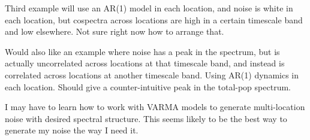 \documentclass[letterpaper,11pt]{article}
\begin{document}
Third example will use an AR(1) model in each location, and noise is white in each location, but cospectra across locations are high in a certain timescale band and low elsewhere. Not sure right now how to arrange that.

Would also like an example where noise has a peak in the spectrum, but is actually
uncorrelated across locations at that timescale band, and instead is correlated across
locations at another timescale band. Using AR(1) dynamics in each location. Should
give a counter-intuitive peak in the total-pop spectrum.

I may have to learn how to work with VARMA models to generate multi-location
noise with desired spectral structure. This seems likely to be the best way to
generate my noise the way I need it.



\end{document}
